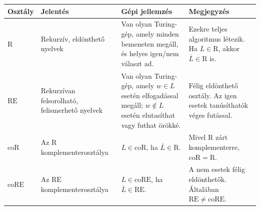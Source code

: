 \begin{tabularx}{\textwidth}{L{22mm}L{34mm}L{38mm}X}
\toprule
\textbf{Osztály} & \textbf{Jelentés} & \textbf{Gépi jellemzés} & \textbf{Megjegyzés} \\
\midrule
$\mathrm{R}$ & Rekurzív, eldönthető nyelvek & Van olyan Turing-gép, amely minden bemeneten megáll, és helyes igen/nem választ ad. & Ezekre teljes algoritmus létezik. Ha $L\in\mathrm{R}$, akkor $\overline L\in\mathrm{R}$ is. \\
$\mathrm{RE}$ & Rekurzívan felsorolható, felismerhető nyelvek & Van olyan Turing-gép, amely $w\in L$ esetén elfogadással megáll; $w\notin L$ esetén elutasíthat vagy futhat örökké. & Félig eldönthető osztály. Az igen esetek tanúsíthatók véges futással. \\
$\mathrm{coR}$ & Az $\mathrm{R}$ komplementerosztálya & $L\in\mathrm{coR}$, ha $\overline L\in\mathrm{R}$. & Mivel $\mathrm{R}$ zárt komplementerre, $\mathrm{coR}=\mathrm{R}$. \\
$\mathrm{coRE}$ & Az $\mathrm{RE}$ komplementerosztálya & $L\in\mathrm{coRE}$, ha $\overline L\in\mathrm{RE}$. & A nem esetek félig eldönthetők. Általában $\mathrm{RE}\neq\mathrm{coRE}$. \\
\bottomrule
\end{tabularx}
